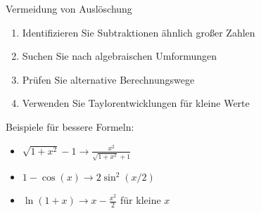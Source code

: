 \begin{KR}{Vermeidung von Auslöschung}
\begin{enumerate}
    \item Identifizieren Sie Subtraktionen ähnlich großer Zahlen
    \item Suchen Sie nach algebraischen Umformungen
    \item Prüfen Sie alternative Berechnungswege
    \item Verwenden Sie Taylorentwicklungen für kleine Werte
\end{enumerate}

Beispiele für bessere Formeln:
    \begin{itemize}
        \item $\sqrt{1+x^2}-1 \rightarrow \frac{x^2}{\sqrt{1+x^2}+1}$
        \item $1-\cos(x) \rightarrow 2\sin^2(x/2)$
        \item $\ln(1+x) \rightarrow x-\frac{x^2}{2}$ für kleine $x$
    \end{itemize}
\end{KR}


